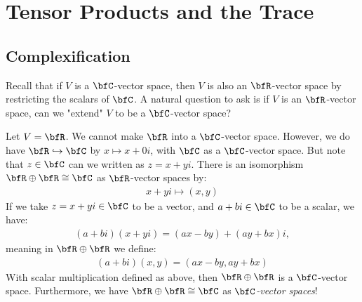 \chapter{Tensor Products and the Trace}
\vspace{12pt}

\section{Complexification}
    Recall that if $V$ is a $\bfC$-vector space, then $V$ is also an $\bfR$-vector space by restricting the scalars of $\bfC$. A natural question to ask is if $V$ is an $\bfR$-vector space, can we "extend" $V$ to be a $\bfC$-vector space?

    \begin{example}
        Let $V = \bfR$. We cannot make $\bfR$ into a $\bfC$-vector space. However, we do have $\bfR \hookrightarrow \bfC$ by $x \mapsto x + 0i$, with $\bfC$ as a $\bfC$-vector space. But note that $z \in \bfC$ can we written as $z = x+yi$. There is an isomorphism $\bfR \oplus \bfR \cong \bfC$ as $\bfR$-vector spaces by:
            \begin{equation*}
            \begin{split}
                x+yi \mapsto (x,y)
            \end{split}
            \end{equation*}
        If we take $z = x+yi \in \bfC$ to be a vector, and $a+bi \in \bfC$ to be a scalar, we have:
            \begin{equation*}
            \begin{split}
                (a+bi)(x+yi) = (ax-by)+(ay+bx)i,
            \end{split}
            \end{equation*}
        meaning in $\bfR \oplus \bfR$ we define:
            \begin{equation*}
            \begin{split}
                (a+bi)(x,y) = (ax-by,ay+bx)
            \end{split}
            \end{equation*}
        With scalar multiplication defined as above, then $\bfR \oplus \bfR$ is a $\bfC$-vector space. Furthermore, we have $\bfR \oplus \bfR \cong \bfC$ as \textit{$\bfC$-vector spaces}!
    \end{example}

